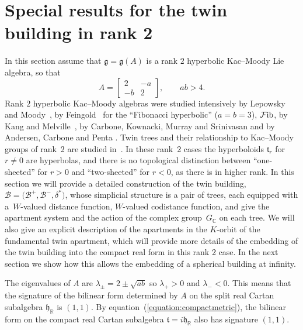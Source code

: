 \documentclass[pdftex]{sigma}
\numberwithin{equation}{section}
\def\C{{\mathbb C}}
\def\R{\mathbb{R}}
\def\cB{\mathcal B}
\def\cF{\mathcal F}
\def\fg{\mathfrak{g}}
\def\fh{\mathfrak{h}}
\def\ft{\mathfrak{t}}
\begin{document}
\section{Special results for the twin building in rank 2}\label{section:Lightcone construction of the Tits building in rank 2 hyperbolic type}

In this section assume that $\fg = \fg(A)$ is a rank $2$ hyperbolic Kac--Moody Lie algebra, so that
\[A =\begin{bmatrix} 2 & -a\\ -b & 2\end{bmatrix},\qquad ab > 4.\]
Rank $2$ hyperbolic Kac--Moody algebras were studied intensively by Lepowsky and Moody~\cite{LepowskyMoody79}, by
Feingold~\cite{Feingold80} for the ``Fibonacci hyperbolic'' ($a=b=3$), $\cF{\rm ib}$, by Kang and Melville~\cite{KangMelville95},
by Carbone, Kownacki, Murray and Srinivasan \cite{CKMS19} and by Andersen, Carbone and Penta \cite{ACP11}. Twin trees and their relationship to Kac--Moody groups of rank~2 are studied in~\cite{Tits96}.
In these rank~2 cases the hyperboloids $\ft_r$ for $r\neq 0$ are hyperbolas, and there is no topological distinction between ``one-sheeted'' for $r > 0$ and ``two-sheeted'' for $r < 0$, as there is in higher rank.
In this section we will provide a detailed construction of the twin building, $\cB= \big(\cB^+, \cB^-,\delta^*\big)$, whose simplicial structure is a pair of trees, each equipped with a~$W$-valued distance function, $W$-valued codistance function, and give the apartment system and the action of the complex group~$G_\C$ on each tree. We will also give an explicit description of the apartments in the $K$-orbit of the fundamental twin apartment, which will
provide more details of the embedding of the twin building into the compact real form in this rank 2 case.
In the next section we show how this allows the embedding of a spherical building at infinity.

The eigenvalues of $A$ are $\lambda_{\pm}=2\pm \sqrt{ab}$ so $\lambda_+ > 0$ and $\lambda_- < 0$. This means that
the signature of the bilinear form determined by $A$ on the split real Cartan subalgebra $\fh_\R$ is $(1,1)$. By equation~(\ref{equation:compactmetric}), the bilinear form on the compact real Cartan subalgebra $\ft=i\fh_\R$ also has signature $(1,1)$.
\end{document}
